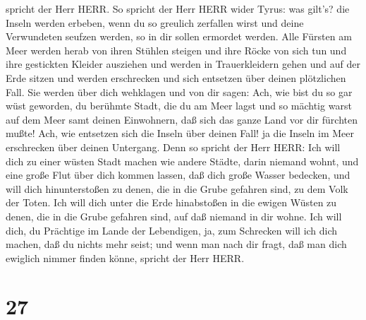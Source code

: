 spricht der Herr HERR.  So spricht der Herr HERR wider
Tyrus: was gilt's? die Inseln werden erbeben, wenn du so greulich
zerfallen wirst und deine Verwundeten seufzen werden, so in dir sollen
ermordet werden.  Alle Fürsten am Meer werden herab von
ihren Stühlen steigen und ihre Röcke von sich tun und ihre gestickten
Kleider ausziehen und werden in Trauerkleidern gehen und auf der Erde
sitzen und werden erschrecken und sich entsetzen über deinen plötzlichen
Fall.  Sie werden über dich wehklagen und von dir sagen:
Ach, wie bist du so gar wüst geworden, du berühmte Stadt, die du am Meer
lagst und so mächtig warst auf dem Meer samt deinen Einwohnern, daß sich
das ganze Land vor dir fürchten mußte!  Ach, wie entsetzen
sich die Inseln über deinen Fall! ja die Inseln im Meer erschrecken über
deinen Untergang.  Denn so spricht der Herr HERR: Ich will
dich zu einer wüsten Stadt machen wie andere Städte, darin niemand
wohnt, und eine große Flut über dich kommen lassen, daß dich große
Wasser bedecken,  und will dich hinunterstoßen zu denen,
die in die Grube gefahren sind, zu dem Volk der Toten. Ich will dich
unter die Erde hinabstoßen in die ewigen Wüsten zu denen, die in die
Grube gefahren sind, auf daß niemand in dir wohne. Ich will dich, du
Prächtige im Lande der Lebendigen,  ja, zum Schrecken will
ich dich machen, daß du nichts mehr seist; und wenn man nach dir fragt,
daß man dich ewiglich nimmer finden könne, spricht der Herr HERR.

\hypertarget{section-26}{%
\section{27}\label{section-26}}

